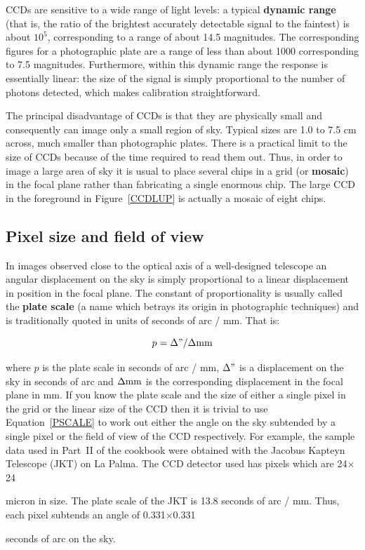 \documentclass[twoside,11pt]{article}
\newcommand{\html}[1]{}
\newcommand{\latex}[1]{#1}
\newcommand{\xlabel}[1]{}
\begin{document}
CCDs are sensitive to a wide range of light levels: a typical {\bf
dynamic range} (that is, the ratio of the brightest accurately detectable
signal to the faintest) is about $10^{5}$, corresponding to a range of
about 14.5 magnitudes.  The corresponding figures for a photographic plate
are a range of less than about 1000 corresponding to 7.5 magnitudes.
Furthermore, within this dynamic range the response is essentially linear:
the size of the signal is simply proportional to the number of photons
detected, which makes calibration straightforward.

The principal disadvantage of CCDs is that they are physically small and
consequently can image only a small region of sky.  Typical sizes are
1.0 to 7.5 cm across, much smaller than photographic plates.  There is
a practical limit to the size of CCDs because of the time required to read
them out.  Thus, in order to image a large area of sky it is usual to
place several chips in a grid (or {\bf mosaic}) in the focal plane rather
than fabricating a single enormous chip.  The large CCD in the foreground
in Figure~\ref{CCDLUP} is actually a mosaic of eight chips.

\subsection{\xlabel{PLATESCALE}Pixel size and field of view}

In images observed close to the optical axis of a well-designed telescope
an angular displacement on the sky is simply proportional to a linear
displacement in position in the focal plane.  The constant of
proportionality is usually called the {\bf plate scale} (a name which
betrays its origin in photographic techniques) and is traditionally
quoted in units of seconds of arc / mm.  That is:

\begin{equation}
p = \Delta " / \Delta {\rm mm}  \label{PSCALE}
\end{equation}

where $p$ is the plate scale in seconds of arc / mm, $\Delta "$ is a
displacement on the sky in seconds of arc and $\Delta {\rm mm}$ is the
corresponding displacement in the focal plane in mm.  If you know the plate
scale and the size of either a single pixel in the grid or the linear size
of the CCD then it is trivial to use Equation~\ref{PSCALE} to work out
either the angle on the sky subtended by a single pixel or the field of
view of the CCD respectively.  For example, the sample data used in Part~II
of the cookbook were obtained with the Jacobus Kapteyn Telescope (JKT) on
La Palma.  The CCD detector used has pixels which are 
\latex{24$\times$24}
\html{24x24}
micron in size.
The plate scale of the JKT is 13.8 seconds of arc / mm.  Thus, each
pixel subtends an angle of 
\latex{0.331$\times$0.331 }
\html{0.331x0.331 }
seconds of arc on the sky.
\end{document}

